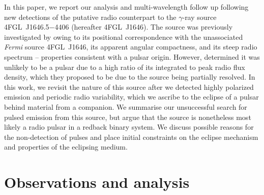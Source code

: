 \documentclass[fleqn,usenatbib]{mnras}
\newcommand{\blinky}{{4FGL}~J1646}
\begin{document}

In this paper, we report our analysis and multi-wavelength follow up following new detections of the putative radio counterpart to the $\gamma$-ray source \textsc{4FGL}~J1646.5$-$4406 (hereafter \blinky{}).
The source was previously investigated by \citet{2018MNRAS.475..942F} owing to its positional correspondence with the unassociated \textit{Fermi} source \blinky{}, its apparent angular compactness, and its steep radio spectrum -- properties consistent with a pulsar origin. However, \citet{2018MNRAS.475..942F} determined it was unlikely to be a pulsar due to a high ratio of its integrated to peak radio flux density, which they proposed to be due to the source being partially resolved. In this work, we revisit the nature of this source after we detected highly polarized emission and periodic radio variability, which we ascribe to the eclipse of a pulsar behind material from a companion. We summarise our unsuccessful search for pulsed emission from this source, but argue that the source is nonetheless most likely a radio pulsar in a redback binary system. We discuss possible reasons for the non-detection of pulses and place initial constraints on the eclipse mechanism and properties of the eclipsing medium.%


\section{Observations and analysis} \label{sec:obs}
\end{document}
